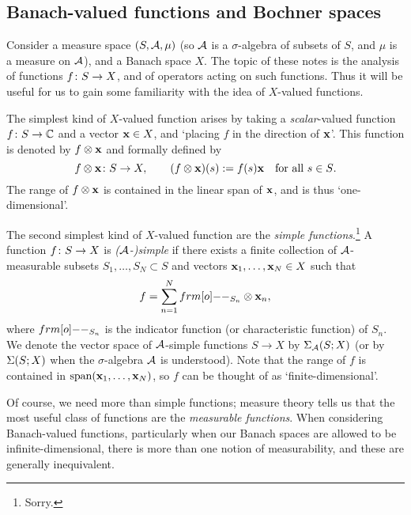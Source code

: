 \subsection{Banach-valued functions and Bochner spaces}

Consider a measure space $(S,\mathcal{A},\mu)$ (so $\mathcal{A}$ is a $\sigma$-algebra of subsets of $S$, and $\mu$ is a measure on $\mathcal{A}$), and a Banach space $X$.
The topic of these notes is the analysis of functions $f \colon S \rightarrow X$, and of operators acting on such functions.
Thus it will be useful for us to gain some familiarity with the idea of $X$-valued functions.

The simplest kind of $X$-valued function arises by taking a \emph{scalar}-valued function $f \colon S \rightarrow \mathbb{C}$ and a vector $\mathbf{x} \in X$, and `placing $f$ in the direction of $\mathbf{x}$'.
This function is denoted by $f \otimes \mathbf{x}$ and formally defined by
\begin{equation*}
  f \otimes \mathbf{x} \colon S \rightarrow X, \qquad (f \otimes \mathbf{x})(s) := f(s)\mathbf{x} \quad \text{for all $s \in S$.}
\end{equation*}
The range of $f \otimes \mathbf{x}$ is contained in the linear span of $\mathbf{x}$, and is thus `one-dimensional'.

The second simplest kind of $X$-valued function are the \emph{simple functions}.\footnote{Sorry.}
A function $f \colon S \rightarrow X$ is \emph{($\mathcal{A}$-)simple} if there exists a finite collection of $\mathcal{A}$-measurable subsets $S_1,\ldots,S_N \subset S$ and vectors $\mathbf{x}_1,\ldots,\mathbf{x}_N \in X$ such that
\begin{equation*}
  f = \sum_{n=1}^N \1_{S_n} \otimes \mb{x}_n ,
\end{equation*}
where $\1_{S_n}$ is the indicator function (or characteristic function) of $S_n$.
We denote the vector space of $\mathcal{A}$-simple functions $S \to X$ by $\Sigma_{\mathcal{A}}(S;X)$ (or by $\Sigma(S;X)$ when the $\sigma$-algebra $\mathcal{A}$ is understood).
Note that the range of $f$ is contained in $\mathrm{span}(\mathbf{x}_1,\ldots,\mathbf{x}_N)$, so $f$ can be thought of as `finite-dimensional'.

Of course, we need more than simple functions; measure theory tells us that the most useful class of functions are the \emph{measurable functions}.
When considering Banach-valued functions, particularly when our Banach spaces are allowed to be infinite-dimensional, there is more than one notion of measurability, and these are generally inequivalent.

